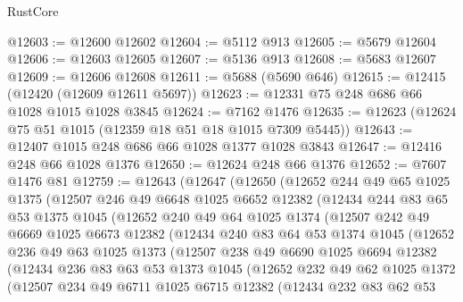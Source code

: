 \begin{lexlean}{RustCore}
\begin{coremodule}
@12603 := @12600 @12602
@12604 := @5112 @913
@12605 := @5679 @12604
@12606 := @12603 @12605
@12607 := @5136 @913
@12608 := @5683 @12607
@12609 := @12606 @12608
@12611 := @5688 (@5690 @646)
@12615 := @12415 (@12420 (@12609 @12611 @5697))
@12623 := @12331 @75 @248 @686 @66 @1028 @1015 @1028 @3845
@12624 := @7162 @1476
@12635 := @12623 (@12624 @75 @51 @1015 (@12359 @18 @51 @18 @1015 @7309 @5445))
@12643 := @12407 @1015 @248 @686 @66 @1028 @1377 @1028 @3843
@12647 := @12416 @248 @66 @1028 @1376
@12650 := @12624 @248 @66 @1376
@12652 := @7607 @1476 @81
@12759 := @12643
    (@12647
      (@12650
        (@12652
          @244
          @49
          @65
          @1025
          @1375
          (@12507
            @246
            @49
            @6648
            @1025
            @6652
            @12382
            (@12434
              @244
              @83
              @65
              @53
              @1375
              @1045
              (@12652
                @240
                @49
                @64
                @1025
                @1374
                (@12507
                  @242
                  @49
                  @6669
                  @1025
                  @6673
                  @12382
                  (@12434
                    @240
                    @83
                    @64
                    @53
                    @1374
                    @1045
                    (@12652
                      @236
                      @49
                      @63
                      @1025
                      @1373
                      (@12507
                        @238
                        @49
                        @6690
                        @1025
                        @6694
                        @12382
                        (@12434
                          @236
                          @83
                          @63
                          @53
                          @1373
                          @1045
                          (@12652
                            @232
                            @49
                            @62
                            @1025
                            @1372
                            (@12507
                              @234
                              @49
                              @6711
                              @1025
                              @6715
                              @12382
                              (@12434
                                @232
                                @83
                                @62
                                @53

\end{coremodule}
\end{lexlean}
